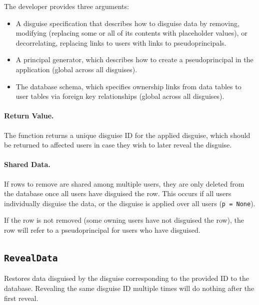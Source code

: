     The developer provides three arguments:
    \begin{itemize}[nosep]
    \item A disguise specification that describes how to disguise data by
    removing, modifying (replacing some or all of its contents with placeholder
    values), or decorrelating, replacing links to users with links to
    pseudoprincipals.
    
    \item A principal generator, which describes how to create a
    pseudoprincipal in the application (global across all disguises).
    
    \item The database schema, which specifies ownership links from data tables to user
    tables via foreign key relationships (global across all disguises).
    \end{itemize}

    \paragraph{Return Value.} 
    The function returns a unique disguise ID for the applied disguise, which
    should be returned to affected users in case they wish to later reveal the
    disguise.

    \paragraph{Shared Data.}
    If rows to remove are shared among multiple users, they are only deleted
    from the database once all users have disguised the row. This occurs if
    \one{} all users individually disguise the data, or \two{} the disguise is
    applied over all users (\texttt{p = None}).
   
    If the row is not removed (some owning users have not disguised the row),
    the row will refer to a pseudoprincipal for users who have disguised.

\subsection{\texttt{RevealData}}


    Restores data disguised by the disguise corresponding to the provided ID to
    the database. Revealing the same disguise ID multiple times will do nothing
    after the first reveal.

